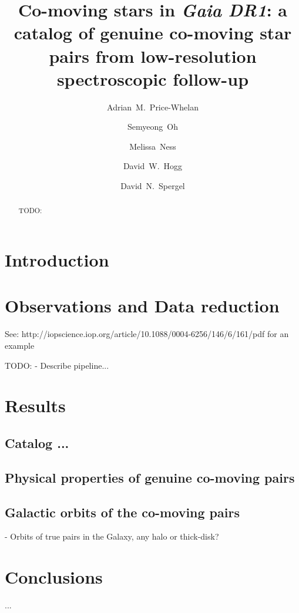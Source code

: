 \documentclass[modern, letterpaper]{aastex61}
\begin{document}
\title{Co-moving stars in \textsl{Gaia DR1}:
       a catalog of genuine co-moving star pairs from low-resolution spectroscopic follow-up}

\author{Adrian~M.~Price-Whelan}

\author{Semyeong~Oh}

\author{Melissa~Ness}

\author{David~W.~Hogg}

\author{David~N.~Spergel}

\begin{abstract}
TODO:

\end{abstract}


\section{Introduction}\label{sec:introduction}

\section{Observations and Data reduction}\label{sec:reduction}

See: http://iopscience.iop.org/article/10.1088/0004-6256/146/6/161/pdf for an example


TODO:
- Describe pipeline...

\section{Results}

\subsection{Catalog ...}\label{sec:}

\subsection{Physical properties of genuine co-moving pairs}\label{sec:}

\subsection{Galactic orbits of the co-moving pairs}\label{sec:}

- Orbits of true pairs in the Galaxy, any halo or thick-disk?

\section{Conclusions }



\acknowledgements
...



\end{document}
